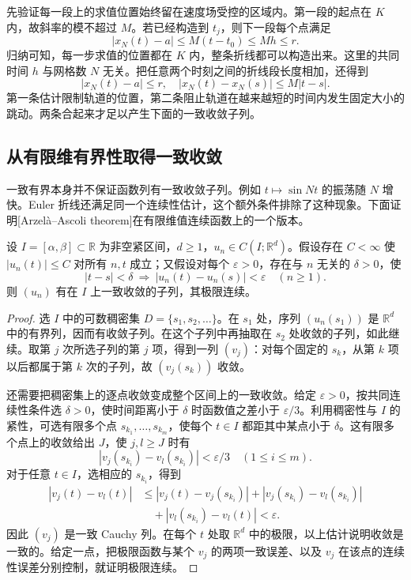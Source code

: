 先验证每一段上的求值位置始终留在速度场受控的区域内。第一段的起点在 \(K\) 内，故斜率的模不超过 \(M\)。若已经构造到 \(t_j\)，则下一段每个点满足
\[
 |x_N(t)-a|\leq M(t-t_0)\leq Mh\leq r.
\]
归纳可知，每一步求值的位置都在 \(K\) 内，整条折线都可以构造出来。这里的共同时间 \(h\) 与网格数 \(N\) 无关。把任意两个时刻之间的折线段长度相加，还得到
\begin{equation}\label{b2:eq:ode-euler-uniform-bounds}
 |x_N(t)-a|\leq r,
 \quad |x_N(t)-x_N(s)|\leq M|t-s|.
\end{equation}
第一条估计限制轨道的位置，第二条阻止轨道在越来越短的时间内发生固定大小的跳动。两条合起来才足以产生下面的一致收敛子列。

\subsection{从有限维有界性取得一致收敛}
\label{b2:subsec:ode-euler-compactness}

一致有界本身并不保证函数列有一致收敛子列。例如 \(t\mapsto\sin Nt\) 的振荡随 \(N\) 增快。Euler 折线还满足同一个连续性估计，这个额外条件排除了这种现象。下面证明[Arzel\`a--Ascoli theorem]在有限维值连续函数上的一个版本。

\begin{lemma}\label{b2:lem:ode-arzela-ascoli}
设 \(I=[\alpha,\beta]\subset\mathbb R\) 为非空紧区间，\(d\geq1\)，\(u_n\in C(I;\mathbb R^d)\)。假设存在 \(C<\infty\) 使 \(|u_n(t)|\leq C\) 对所有 \(n,t\) 成立；又假设对每个 \(\varepsilon>0\)，存在与 \(n\) 无关的 \(\delta>0\)，使
\[
 |t-s|<\delta\ \Longrightarrow\ |u_n(t)-u_n(s)|<\varepsilon
 \quad(n\geq1).
\]
则 \((u_n)\) 有在 \(I\) 上一致收敛的子列，其极限连续。
\end{lemma}
\begin{proof}
选 \(I\) 中的可数稠密集 \(D=\{s_1,s_2,\ldots\}\)。在 \(s_1\) 处，序列 \((u_n(s_1))\) 是 \(\mathbb R^d\) 中的有界列，因而有收敛子列。在这个子列中再抽取在 \(s_2\) 处收敛的子列，如此继续。取第 \(j\) 次所选子列的第 \(j\) 项，得到一列 \((v_j)\)：对每个固定的 \(s_k\)，从第 \(k\) 项以后都属于第 \(k\) 次的子列，故 \((v_j(s_k))\) 收敛。

还需要把稠密集上的逐点收敛变成整个区间上的一致收敛。给定 \(\varepsilon>0\)，按共同连续性条件选 \(\delta>0\)，使时间距离小于 \(\delta\) 时函数值之差小于 \(\varepsilon/3\)。利用稠密性与 \(I\) 的紧性，可选有限多个点 \(s_{k_1},\ldots,s_{k_m}\)，使每个 \(t\in I\) 都距其中某点小于 \(\delta\)。这有限多个点上的收敛给出 \(J\)，使 \(j,l\geq J\) 时有
\[
 |v_j(s_{k_i})-v_l(s_{k_i})|<\varepsilon/3
 \quad(1\leq i\leq m).
\]
对于任意 \(t\in I\)，选相应的 \(s_{k_i}\)，得到
\[
 \begin{aligned}
 |v_j(t)-v_l(t)|
 &\leq |v_j(t)-v_j(s_{k_i})|
       +|v_j(s_{k_i})-v_l(s_{k_i})|\\
 &\quad+|v_l(s_{k_i})-v_l(t)|<\varepsilon.
 \end{aligned}
\]
因此 \((v_j)\) 是一致 Cauchy 列。在每个 \(t\) 处取 \(\mathbb R^d\) 中的极限，以上估计说明收敛是一致的。给定一点，把极限函数与某个 \(v_j\) 的两项一致误差、以及 \(v_j\) 在该点的连续性误差分别控制，就证明极限连续。
\end{proof}

